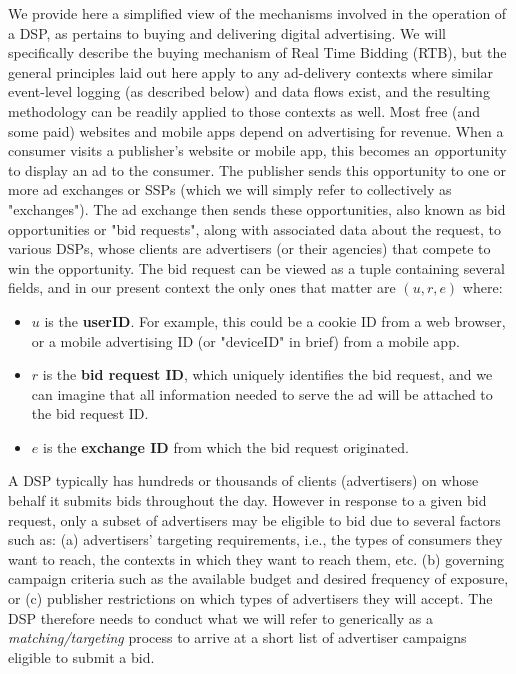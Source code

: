 \documentclass[11pt,a4paper]{article}
\theoremstyle{definition}
\theoremstyle{remark}
\theoremstyle{definition}
\theoremstyle{definition}
\theoremstyle{definition}
\theoremstyle{definition}
\theoremstyle{definition}
\theoremstyle{definition}
\begin{document}
We provide here a simplified view of the mechanisms involved in the operation of a DSP, as pertains to buying and delivering digital advertising. We will specifically describe the buying mechanism of Real Time Bidding (RTB), but the general principles laid out here apply to any ad-delivery contexts where similar event-level logging (as described below) and data flows exist, and the resulting methodology can be readily applied to those contexts as well. 
Most free (and some paid) websites and mobile apps depend on advertising for revenue. 
When a consumer visits a publisher's website or mobile app, this becomes an {\emph opportunity} to display an ad to the consumer. The publisher sends this opportunity to one or more ad exchanges or SSPs (which we will simply refer to collectively as "exchanges").
The ad exchange then sends these opportunities, also known as bid opportunities or "bid requests", along with associated data about the request, to various DSPs, whose clients are advertisers (or their agencies) that compete to win the opportunity. 
The bid request can be viewed as a tuple containing several fields, and in our present context the only ones that matter are $(u, r, e)$ where:
\begin{itemize}
	\item $u$ is the {\bf userID}. For example, this could be a cookie ID from a web browser, or a mobile advertising ID (or "deviceID" in brief) from a mobile app. 
	\item $r$ is the {\bf bid request ID}, which uniquely identifies the bid request, and we can imagine that all information needed to serve the ad will be attached to the bid request ID.
	\item $e$ is the {\bf exchange ID} from which the bid request originated.
\end{itemize}



A DSP typically has hundreds or thousands of clients (advertisers) on whose behalf it submits bids throughout the day. 
However in response to a given bid request, only a subset of advertisers may be eligible to bid due to several factors such as: (a) advertisers' targeting requirements, i.e., the types of consumers they want to reach, the contexts in which they want to reach them, etc. (b) governing campaign criteria such as the available budget and desired frequency of exposure, or (c) publisher restrictions on which types of advertisers they will accept. 
The DSP therefore needs to conduct what we will refer to generically as a {\em matching/targeting} process to arrive at a short list of advertiser campaigns eligible to submit a bid. 
\end{document}
